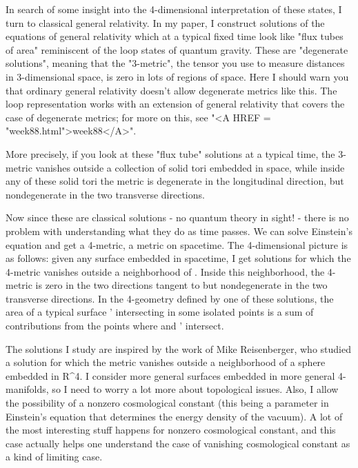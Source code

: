 In search of some insight into the 4-dimensional interpretation of
these states, I turn to classical general relativity.  In my paper, I
construct solutions of the equations of general relativity which at a
typical fixed time look like "flux tubes of area" reminiscent of the
loop states of quantum gravity.  These are "degenerate solutions",
meaning that the "3-metric", the tensor you use to measure distances
in 3-dimensional space, is zero in lots of regions of space.  Here I
should warn you that ordinary general relativity doesn't allow
degenerate metrics like this.  The loop representation works with an
extension of general relativity that covers the case of degenerate
metrics; for more on this, see "<A HREF = "week88.html">week88</A>".

More precisely, if you look at these "flux tube" solutions at a
typical time, the 3-metric vanishes outside a collection of solid tori
embedded in space, while inside any of these solid tori the metric is
degenerate in the longitudinal direction, but nondegenerate in the two
transverse directions.

Now since these are classical solutions - no quantum theory in sight! -
there is no problem with understanding what they do as time passes.
We can solve Einstein's equation and get a 4-metric, a metric on
spacetime.  The 4-dimensional picture is as follows: given any surface
\Sigma  embedded in spacetime, I get solutions for which the 4-metric
vanishes outside a neighborhood of \Sigma .  Inside this neighborhood,
the 4-metric is zero in the two directions tangent to \Sigma  but
nondegenerate in the two transverse directions.  In the 4-geometry
defined by one of these solutions, the area of a typical surface
\Sigma ' intersecting \Sigma  in some isolated points is a sum of
contributions from the points where \Sigma  and \Sigma ' intersect.

The solutions I study are inspired by the work of Mike Reisenberger,
who studied a solution for which the metric vanishes outside a
neighborhood of a sphere embedded in R^4.  I consider more general
surfaces embedded in more general 4-manifolds, so I need to worry a
lot more about topological issues.  Also, I allow the possibility of a
nonzero cosmological constant (this being a parameter in Einstein's
equation that determines the energy density of the vacuum).  A lot of
the most interesting stuff happens for nonzero cosmological constant,
and this case actually helps one understand the case of vanishing
cosmological constant as a kind of limiting case.

